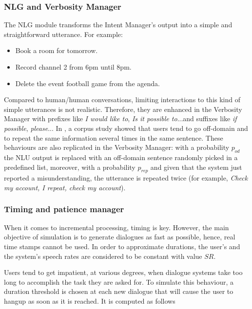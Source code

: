 			
			\subsubsection{NLG and Verbosity Manager}
				
				The NLG module transforms the Intent Manager's output into a simple and straightforward utterance. For example:
				
				\begin{itemize}
					\item Book a room for tomorrow.
					\item Record channel 2 from 6pm until 8pm.
					\item Delete the event football game from the agenda.
				\end{itemize}
				
				Compared to human/human conversations, limiting interactions to this kind of simple utterances is not realistic. Therefore, they are enhanced in the Verbosity Manager with prefixes like \textit{I would like to}, \textit{Is it possible to}...and suffixes like \textit{if possible}, \textit{please}... In \cite{Ghigi2014}, a corpus study showed that users tend to go off-domain and to repeat the same information several times in the same sentence. These behaviours are also replicated in the Verbosity Manager: with a probability $p_{od}$ the NLU output is replaced with an off-domain sentence randomly picked in a predefined list, moreover, with a probability $p_{rep}$ and given that the system just reported a misunderstanding, the utterance is repeated twice (for example, \textit{Check my account, I repeat, check my account}).
			
			\subsubsection{Timing and patience manager}
			
				When it comes to incremental processing, timing is key. However, the main objective of simulation is to generate dialogues as fast as possible, hence, real time stamps cannot be used. In order to approximate durations, the user's and the system's speech rates are considered to be constant with value $SR$.
					
					Users tend to get impatient, at various degrees, when dialogue systems take too long to accomplish the task they are asked for. To simulate this behaviour, a duration threshold is chosen at each new dialogue that will cause the user to hangup as soon as it is reached. It is computed as follows
					
